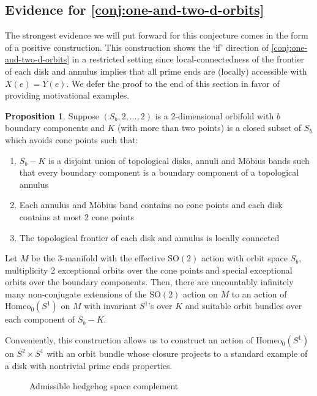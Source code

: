\documentclass[10pt, oneside]{article}
\newcommand{\SO}[1][2]{\text{SO}(#1)}
\newcommand{\homeo}[1][S^1]{\text{Homeo}_0(#1)}
\theoremstyle{definition}
\newtheorem{prop}{Proposition}[section]
\theoremstyle{definition}
\begin{document}
\subsection{Evidence for \texorpdfstring{\cref{conj:one-and-two-d-orbits}}{Theorem \ref*{conj:one-and-two-d-orbits}}}

The strongest evidence we will put forward for this conjecture comes in the form of a positive construction. This construction shows the `if' direction of \cref{conj:one-and-two-d-orbits} in a restricted setting since local-connectedness of the frontier of each disk and annulus implies that all prime ends are (locally) accessible with $X(e)=Y(e)$. 
We defer the proof to the end of this section in favor of providing motivational examples. 

\begin{prop}\label{prop:lc-fr-construction}
    Suppose $(S_b, 2, \dots, 2)$ is a 2-dimensional orbifold with $b$ boundary components and $K$ (with more than two points) is a closed subset of $S_b$ which avoids cone points such that:
    \begin{enumerate}
        \item $S_b - K$ is a disjoint union of topological disks, annuli and M\"{o}bius bands such that every boundary component is a boundary component of a topological annulus
        \item Each annulus and M\"{o}bius band contains no cone points and each disk contains at most 2 cone points
        \item The topological frontier of each disk and annulus is locally connected
    \end{enumerate}
    Let $M$ be the 3-manifold with the effective $\SO$ action with orbit space $S_b$, multiplicity 2 exceptional orbits over the cone points and special exceptional orbits over the boundary components. Then, there are uncountably infinitely many non-conjugate extensions of the $\SO$ action on $M$ to an action of $\homeo$ on $M$ with invariant $S^1$'s over $K$ and suitable orbit bundles over each component of $S_b - K$.
\end{prop}

Conveniently, this construction allows us to construct an action of $\homeo$ on $S^2\times S^1$ with an orbit bundle whose closure projects to a standard example of a disk with nontrivial prime ends properties.

\begin{figure}
    \centering
    
    \caption{Admissible hedgehog space complement}
    \label{fig:admissible-hedgehog}
\end{figure}
\end{document}
